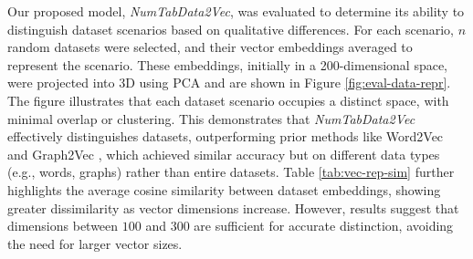 
Our proposed model, \textit{NumTabData2Vec}, was evaluated to determine its ability to distinguish dataset scenarios based on qualitative differences. For each scenario, $n$ random datasets were selected, and their vector embeddings averaged to represent the scenario. These embeddings, initially in a 200-dimensional space, were projected into 3D using PCA and are shown in Figure \ref{fig:eval-data-repr}. The figure illustrates that each dataset scenario occupies a distinct space, with minimal overlap or clustering. This demonstrates that \textit{NumTabData2Vec} effectively distinguishes datasets, outperforming prior methods like Word2Vec and Graph2Vec \cite{b8Word2Vec, b9Graph2Vec}, which achieved similar accuracy but on different data types (e.g., words, graphs) rather than entire datasets. Table \ref{tab:vec-rep-sim} further highlights the average cosine similarity between dataset embeddings, showing greater dissimilarity as vector dimensions increase. However, results suggest that dimensions between $100$ and $300$ are sufficient for accurate distinction, avoiding the need for larger vector sizes.

